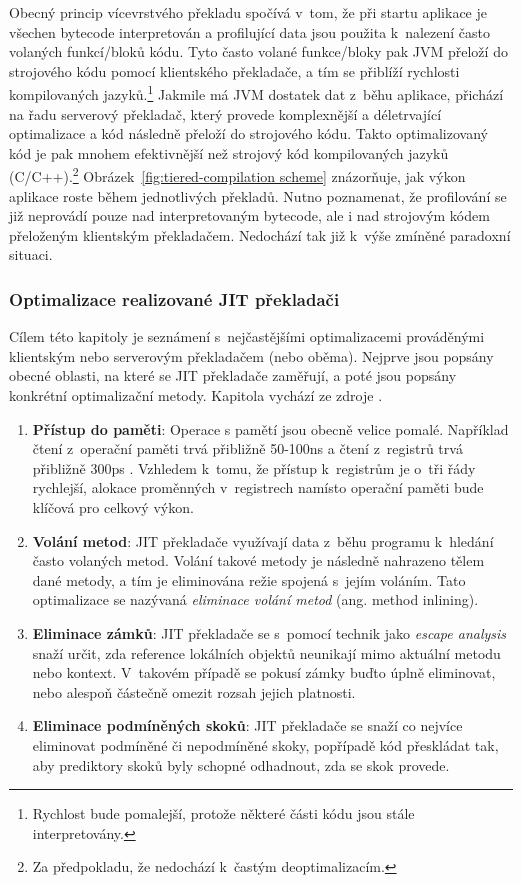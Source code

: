 \documentclass[
  master,
  biblatex,
  figures=true,
  theorems,
  sourcecodes,
  glossaries,
  index
]{kidiplom}
\begin{document}
Obecný princip vícevrstvého překladu spočívá v~tom, že při startu aplikace je všechen bytecode interpretován a profilující data jsou použita k~nalezení často volaných funkcí/bloků kódu. Tyto často volané funkce/bloky pak JVM přeloží do strojového kódu pomocí klientského překladače, a tím se přiblíží rychlosti kompilovaných jazyků.\footnote{Rychlost bude pomalejší, protože některé části kódu jsou stále interpretovány.} Jakmile má JVM dostatek dat z~běhu aplikace, přichází na řadu serverový překladač, který provede komplexnější a déletrvající optimalizace a kód následně přeloží do strojového kódu. Takto optimalizovaný kód je pak mnohem efektivnější než strojový kód kompilovaných jazyků (C/C++).\footnote{Za předpokladu, že nedochází k~častým deoptimalizacím.} Obrázek~\ref{fig:tiered-compilation scheme} znázorňuje, jak výkon aplikace roste během jednotlivých překladů. Nutno poznamenat, že profilování se již neprovádí pouze nad interpretovaným bytecode, ale i nad strojovým kódem přeloženým klientským překladačem. Nedochází tak již k~výše zmíněné paradoxní situaci. \cite{tiered-compilation}


\subsubsection{Optimalizace realizované JIT překladači}
\label{jit-optimalizations}
Cílem této kapitoly je seznámení s~nejčastějšími optimalizacemi prováděnými klientským nebo serverovým překladačem (nebo oběma). Nejprve jsou popsány obecné oblasti, na které se JIT překladače zaměřují, a poté jsou popsány konkrétní optimalizační metody. Kapitola vychází ze zdroje \cite{optimalizace-jvm}.


\begin{enumerate}
    \item \textbf{Přístup do paměti}: Operace s pamětí jsou obecně velice pomalé. Například čtení z~operační paměti trvá přibližně 50-100ns a čtení z~registrů trvá přibližně 300ps \cite{linear-register-allocation}. Vzhledem k~tomu, že přístup k~registrům je o~tři řády rychlejší, alokace proměnných v~registrech namísto operační paměti bude klíčová pro celkový výkon. 
    \item \textbf{Volání metod}: JIT překladače využívají data z~běhu programu k~hledání často volaných metod. Volání takové metody je následně nahrazeno tělem dané metody, a tím je eliminována režie spojená s~jejím voláním. Tato optimalizace se nazývaná \textit{eliminace volání metod} (ang. method inlining).
    \item \textbf{Eliminace zámků}: JIT překladače se s~pomocí technik jako \textit{escape analysis} snaží určit, zda reference lokálních objektů neunikají mimo aktuální metodu nebo kontext. V~takovém případě se pokusí zámky buďto úplně eliminovat, nebo alespoň částečně omezit rozsah jejich platnosti.
    \item \textbf{Eliminace podmíněných skoků}: JIT překladače se snaží co nejvíce eliminovat podmíněné či nepodmíněné skoky, popřípadě kód přeskládat tak, aby prediktory skoků byly schopné odhadnout, zda se skok provede.
\end{enumerate}
\end{document}
